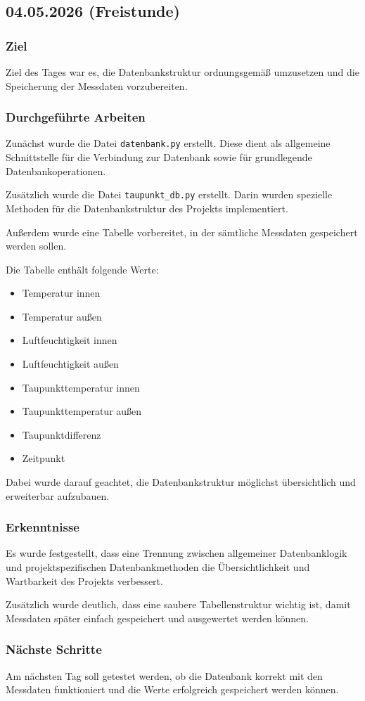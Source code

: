 \subsection{04.05.2026 (Freistunde)}

\subsubsection{Ziel}

Ziel des Tages war es, die Datenbankstruktur
ordnungsgemäß umzusetzen und die Speicherung
der Messdaten vorzubereiten.

\subsubsection{Durchgeführte Arbeiten}

Zunächst wurde die Datei \texttt{datenbank.py}
erstellt.
Diese dient als allgemeine Schnittstelle für die
Verbindung zur Datenbank sowie für grundlegende
Datenbankoperationen.

Zusätzlich wurde die Datei
\texttt{taupunkt\_db.py} erstellt.
Darin wurden spezielle Methoden für die
Datenbankstruktur des Projekts implementiert.

Außerdem wurde eine Tabelle vorbereitet,
in der sämtliche Messdaten gespeichert werden
sollen.

Die Tabelle enthält folgende Werte:

\begin{itemize}
    \item Temperatur innen
    \item Temperatur außen
    \item Luftfeuchtigkeit innen
    \item Luftfeuchtigkeit außen
    \item Taupunkttemperatur innen
    \item Taupunkttemperatur außen
    \item Taupunktdifferenz
    \item Zeitpunkt
\end{itemize}

Dabei wurde darauf geachtet, die Datenbankstruktur
möglichst übersichtlich und erweiterbar aufzubauen.

\subsubsection{Erkenntnisse}

Es wurde festgestellt, dass eine Trennung zwischen
allgemeiner Datenbanklogik und projektspezifischen
Datenbankmethoden die Übersichtlichkeit und
Wartbarkeit des Projekts verbessert.

Zusätzlich wurde deutlich, dass eine saubere
Tabellenstruktur wichtig ist, damit Messdaten
später einfach gespeichert und ausgewertet
werden können.

\subsubsection{Nächste Schritte}

Am nächsten Tag soll getestet werden,
ob die Datenbank korrekt mit den
Messdaten funktioniert und die Werte
erfolgreich gespeichert werden können.